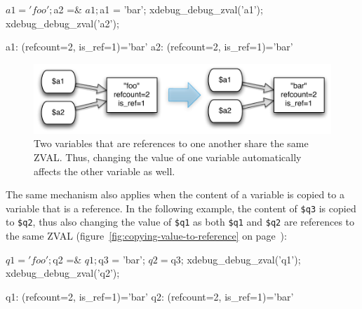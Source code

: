 \begin{phpcode}
$a1 = 'foo';
$a2 =& $a1;
$a1 = 'bar';
xdebug_debug_zval('a1');
xdebug_debug_zval('a2');
\end{phpcode}

\begin{textcode}
a1: (refcount=2, is_ref=1)='bar'
a2: (refcount=2, is_ref=1)='bar'
\end{textcode}

\begin{figure}[htb]
  \begin{center}
    \includegraphics[scale=0.8]{images/a1_a2}
    \caption{Two variables that are references to one another share the same ZVAL. Thus, changing the value of one variable automatically affects the other variable as well.}
    \label{fig:simple-reference}
  \end{center}
\end{figure}


The same mechanism also applies when the content of a variable is copied to a variable that is a reference. In the following example, the content of \texttt{\$q3} is copied to \texttt{\$q2}, thus also changing the value of \texttt{\$q1} as both \texttt{\$q1} and \texttt{\$q2} are references to the same ZVAL (figure~\ref{fig:copying-value-to-reference} on page~\pageref{fig:copying-value-to-reference}):

\begin{phpcode}
$q1 = 'foo';
$q2 =& $q1;

$q3 = 'bar';
$q2 = $q3;
xdebug_debug_zval('q1');
xdebug_debug_zval('q2');
\end{phpcode}

\begin{textcode}
q1: (refcount=2, is_ref=1)='bar'
q2: (refcount=2, is_ref=1)='bar'
\end{textcode}

